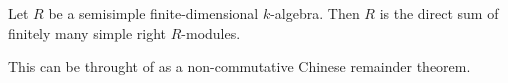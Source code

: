 Let $R$ be a semisimple finite-dimensional $k$-algebra. Then $R$ is the direct
sum of finitely many simple right $R$-modules.

This can be throught of as a non-commutative Chinese remainder theorem.
